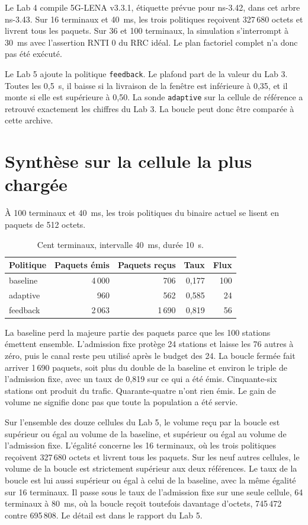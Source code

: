 \documentclass[11pt,a4paper]{article}
\begin{document}
Le Lab 4 compile 5G-LENA v3.3.1, étiquette prévue pour ns-3.42, dans cet arbre ns-3.43. Sur 16 terminaux et 40~ms, les trois politiques reçoivent 327\,680 octets et livrent tous les paquets. Sur 36 et 100 terminaux, la simulation s'interrompt à 30~ms avec l'assertion RNTI 0 du RRC idéal. Le plan factoriel complet n'a donc pas été exécuté.

Le Lab 5 ajoute la politique \texttt{feedback}. Le plafond part de la valeur du Lab 3. Toutes les 0,5~s, il baisse si la livraison de la fenêtre est inférieure à 0,35, et il monte si elle est supérieure à 0,50. La sonde \texttt{adaptive} sur la cellule de référence a retrouvé exactement les chiffres du Lab 3. La boucle peut donc être comparée à cette archive.

\section{Synthèse sur la cellule la plus chargée}

À 100 terminaux et 40~ms, les trois politiques du binaire actuel se lisent en paquets de 512 octets.

\begin{longtable}{@{}lrrrr@{}}
\caption{Cent terminaux, intervalle 40~ms, durée 10~s.}\\
\toprule
Politique & Paquets émis & Paquets reçus & Taux & Flux \\
\midrule
\endfirsthead
baseline & 4\,000 & 706 & 0,177 & 100 \\
adaptive & 960 & 562 & 0,585 & 24 \\
feedback & 2\,063 & 1\,690 & 0,819 & 56 \\
\bottomrule
\end{longtable}

La baseline perd la majeure partie des paquets parce que les 100 stations émettent ensemble. L'admission fixe protège 24 stations et laisse les 76 autres à zéro, puis le canal reste peu utilisé après le budget des 24. La boucle fermée fait arriver 1\,690 paquets, soit plus du double de la baseline et environ le triple de l'admission fixe, avec un taux de 0,819 sur ce qui a été émis. Cinquante-six stations ont produit du trafic. Quarante-quatre n'ont rien émis. Le gain de volume ne signifie donc pas que toute la population a été servie.

Sur l'ensemble des douze cellules du Lab 5, le volume reçu par la boucle est supérieur ou égal au volume de la baseline, et supérieur ou égal au volume de l'admission fixe. L'égalité concerne les 16 terminaux, où les trois politiques reçoivent 327\,680 octets et livrent tous les paquets. Sur les neuf autres cellules, le volume de la boucle est strictement supérieur aux deux références. Le taux de la boucle est lui aussi supérieur ou égal à celui de la baseline, avec la même égalité sur 16 terminaux. Il passe sous le taux de l'admission fixe sur une seule cellule, 64 terminaux à 80~ms, où la boucle reçoit toutefois davantage d'octets, 745\,472 contre 695\,808. Le détail est dans le rapport du Lab 5.
\end{document}
